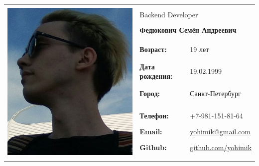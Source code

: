 \documentclass[12pt]{article}
\begin{document}
\pagestyle{empty}




\begin{center}
\begin{tabular}{lll}
\hline
&&\\
\multirow{12}{*}{\includegraphics[scale=0.42]{1}}&\multicolumn{2}{l}{Backend Developer}\\
&\multicolumn{2}{l}{\textbf{Федюкович Семён Андреевич}}\\
&&\\
&\textbf{Возраст:} & 19 лет    \\
&\textbf{Дата рождения:} & 19.02.1999  \\
&\textbf{Город:}& Санкт-Петербург  \\
&&\\
\hhline{~--}
&&\\
&\textbf{Телефон:} & +7-981-151-81-64  \\
&\textbf{Email:} & \href{mailto:yohimik@gmail.com}{yohimik@gmail.com}  \\
&\textbf{Github:} & \href{https://github.com/yohimik}{github.com/yohimik}   \\
&&\\
&&\\
\hline
\end{tabular}
\end{center}
\end{document}
